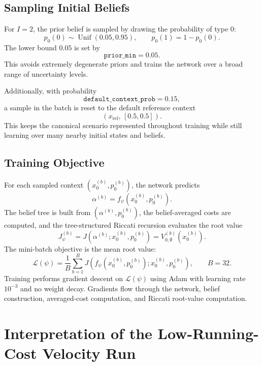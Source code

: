 \documentclass[11pt]{article}
\begin{document}
\subsection{Sampling Initial Beliefs}

For $I=2$, the prior belief is sampled by drawing the probability of type $0$:
\[
    p_0(0) \sim \operatorname{Unif}(0.05,0.95),
    \qquad
    p_0(1)=1-p_0(0).
\]
The lower bound $0.05$ is set by
\[
    \texttt{prior\_min}=0.05.
\]
This avoids extremely degenerate priors and trains the network over a broad
range of uncertainty levels.

Additionally, with probability
\[
    \texttt{default\_context\_prob}=0.15,
\]
a sample in the batch is reset to the default reference context
\[
    (x_{\mathrm{ref}},\, [0.5,0.5]).
\]
This keeps the canonical scenario represented throughout training while still
learning over many nearby initial states and beliefs.

\subsection{Training Objective}

For each sampled context $(x_0^{(b)},p_0^{(b)})$, the network predicts
\[
    \alpha^{(b)} = f_\psi(x_0^{(b)},p_0^{(b)}).
\]
The belief tree is built from $(\alpha^{(b)},p_0^{(b)})$, the belief-averaged
costs are computed, and the tree-structured Riccati recursion evaluates the
root value
\[
    J_\psi^{(b)}
    =
    J(\alpha^{(b)};x_0^{(b)},p_0^{(b)})
    =
    V_{0,\emptyset}^{(b)}(x_0^{(b)}).
\]
The mini-batch objective is the mean root value:
\[
    \mathcal L(\psi)
    =
    \frac{1}{B}
    \sum_{b=1}^{B}
    J(f_\psi(x_0^{(b)},p_0^{(b)});x_0^{(b)},p_0^{(b)}),
    \qquad B=32.
\]
Training performs gradient descent on $\mathcal L(\psi)$ using Adam with
learning rate $10^{-3}$ and no weight decay.  Gradients flow through the
network, belief construction, averaged-cost computation, and Riccati root-value
computation.

\section{Interpretation of the Low-Running-Cost Velocity Run}
\end{document}
